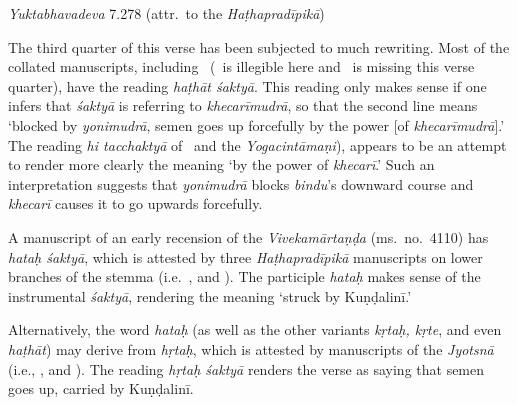 \begin{ekdosis}
\begin{testimonia}[hp03_040]
\emph{Yuktabhavadeva} 7.278 (attr.~to the \emph{Haṭhapradīpikā})
\begin{versinnote}
\end{versinnote}
\end{testimonia}

\begin{philcomm}[hp03_040]

The third quarter of this verse has been subjected to much rewriting. Most of the collated manuscripts, including \alphaTwo\ (\alphaOne\ is illegible here and \alphaThree\ is missing this verse quarter), have the reading \emph{haṭhāt śaktyā}. This reading only makes sense if one infers that \emph{śaktyā} is referring to \emph{khecarīmudrā}, so that the second line means `blocked by \emph{yonimudrā}, semen goes up forcefully by the power [of \emph{khecarīmudrā}].' The reading \emph{hi tacchaktyā} of \deltaTwo\ and the \emph{Yogacintāmaṇi}), appears to be an attempt to render more clearly the meaning `by the power of \emph{khecarī}.' Such an interpretation suggests that \emph{yonimudrā} blocks \emph{bindu}'s downward course and \emph{khecarī} causes it to go upwards forcefully.\lb

A manuscript of an early recension of the \emph{Vivekamārtaṇḍa} (ms.~no.~4110) has \emph{hataḥ śaktyā}, which is attested by three \emph{Haṭhapradīpikā} manuscripts on lower branches of the stemma (i.e.~, %
 and ). The participle \emph{hataḥ} makes sense of the instrumental \emph{śaktyā}, rendering the meaning `struck by Kuṇḍalinī.' \lb

Alternatively, the word \emph{hataḥ} (as well as the other variants \emph{kṛtaḥ, kṛte}, and even \emph{haṭhāt}) may derive from \emph{hṛtaḥ}, which is attested by manuscripts of the \emph{Jyotsnā} (i.e., ,  and ). %
The reading \emph{hṛtaḥ śaktyā} renders the verse as saying that semen goes up, carried by Kuṇḍalinī. 


%


\end{philcomm}
\end{ekdosis}
